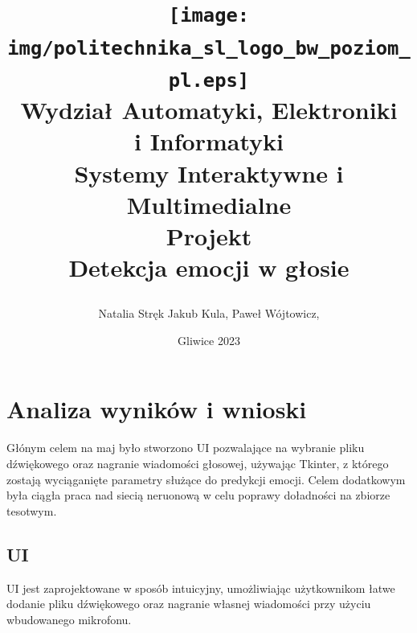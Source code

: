\documentclass[12pt,titlepage]{article}
\title{
\texttt{[image: img/politechnika\_sl\_logo\_bw\_poziom\_pl.eps]}\\
\textbf{Wydział Automatyki, Elektroniki\\
i Informatyki}\\
\vspace*{1cm}
Systemy Interaktywne i Multimedialne \\ Projekt \\ Detekcja emocji w głosie

\vspace*{5cm}
}
\author{
Natalia Stręk
Jakub Kula,
Paweł Wójtowicz,
}
\date{Gliwice 2023}
\begin{document}
\maketitle

\tableofcontents

\newpage
\section{Analiza wyników i wnioski}
Głónym celem na maj było stworzono UI pozwalające na wybranie pliku dźwiękowego oraz nagranie wiadomości głosowej, używając Tkinter, z którego zostają wyciąganięte parametry służące do predykcji emocji. Celem dodatkowym była ciągła praca nad siecią neruonową w celu poprawy doładności na zbiorze tesotwym.


\subsection{UI}
UI jest zaprojektowane w sposób intuicyjny, umożliwiając użytkownikom łatwe dodanie pliku dźwiękowego oraz nagranie własnej wiadomości przy użyciu wbudowanego mikrofonu.
\end{document}
